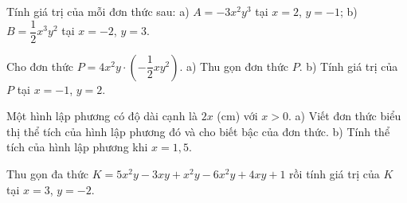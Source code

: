 

\begin{bt}%
	Tính giá trị của mỗi đơn thức sau:
a) $A = -3x^2y^3$ tại $x = 2$, $y = -1$;
b) $B = \dfrac{1}{2}x^3y^2$ tại $x = -2$, $y = 3$.
\end{bt}

\begin{bt}%
	Cho đơn thức $P = 4x^2y \cdot \left(-\dfrac{1}{2}xy^2\right)$.
a) Thu gọn đơn thức $P$.
b) Tính giá trị của $P$ tại $x = -1$, $y = 2$.
\end{bt}

\begin{bt}%
	Một hình lập phương có độ dài cạnh là $2x$ (cm) với $x > 0$.
a) Viết đơn thức biểu thị thể tích của hình lập phương đó và cho biết bậc của đơn thức.
b) Tính thể tích của hình lập phương khi $x = 1{,}5$.
\end{bt}

\begin{bt}%
	Thu gọn đa thức $K = 5x^2y - 3xy + x^2y - 6x^2y + 4xy + 1$ rồi tính giá trị của $K$ tại $x = 3$, $y = -2$.
\end{bt}

